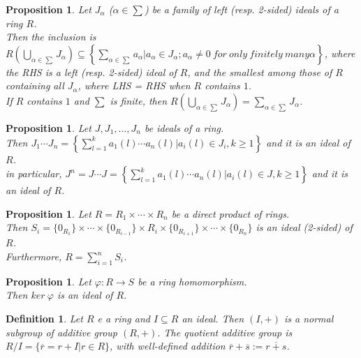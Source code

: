 \documentclass[a4paper,8pt]{article}
\theoremstyle{theorem}
\newtheorem{proposition}[theorem]{Proposition}
\newtheorem{definition}[theorem]{Definition}
\begin{document}
\begin{proposition}
Let $J_\alpha$ ($\alpha \in \sum$) be a family of left (resp. 2-sided) ideals of a ring $R$.\\
Then the inclusion is $R(\bigcup\limits_{\alpha \in \sum}J_{\alpha}) \subseteq \left\{\sum_{\alpha \in \sum} a_{\alpha} | a_{\alpha} \in J_\alpha; a_{\alpha} \neq 0 \ for \ only \ finitely \ many \alpha \right\}$, where the RHS is a left (resp. 2-sided) ideal of $R$, and the smallest among those of $R$ containing all $J_\alpha$, where LHS = RHS when $R$ contains $1$.\\
If $R$ contains $1$ and $\sum$ is finite, then $R(\bigcup\limits_{\alpha \in \sum}J_{\alpha}) = \sum_{\alpha \in \sum} J_{\alpha}$.\\
\end{proposition}


\begin{proposition}
Let $J, J_1, \ldots, J_n$ be ideals of a ring.\\
Then $J_1 \cdots J_n = \left\{ \sum_{l=1}^{k} a_1(l) \cdots a_n(l) | a_i(l) \in J_i, k \geq 1 \right\}$ and it is an ideal of $R$.\\
in particular, $J^n = J \cdots J = \left\{ \sum_{l=1}^{k} a_1(l) \cdots a_n(l) | a_i(l) \in J, k \geq 1 \right\}$ and it is an ideal of $R$.\\
\end{proposition}


\begin{proposition}
Let $R = R_1 \times \cdots \times R_n$ be a direct product of rings.\\
Then $S_i = \{0_{R_1}\} \times \cdots \times \{0_{R_{i-1}}\} \times R_i \times \{0_{R_{i+1}}\} \times \cdots \times \{0_{R_n}\}$ is an ideal (2-sided) of $R$.\\
Furthermore, $R = \sum_{i=1}^{n} S_i$.\\ 
\end{proposition}


\begin{proposition}
Let $\varphi: R \rightarrow S$ be a ring homomorphism.\\
Then $ker \ \varphi$ is an ideal of $R$.\\
\end{proposition}


\begin{definition}
Let $R$ e a ring and $I \subseteq R$ an ideal. Then $(I, +)$ is a normal subgroup of additive group $(R, +)$. The \textit{{\color{blue} quotient additive group}} is $R/I = \{\overline{r} = r + I | r \in R\}$, with well-defined addition $\overline{r} + \overline{s} := \overline{r+s}$.\\
\end{definition}
\end{document}
